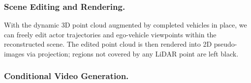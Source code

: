 \documentclass[runningheads]{llncs}
\begin{document}



\subsubsection{Scene Editing and Rendering.}
\label{sec:edit_render}
With the dynamic 3D point cloud augmented by completed vehicles in place, we can freely edit actor trajectories and ego-vehicle viewpoints within the reconstructed scene. The edited point cloud is then rendered into 2D pseudo-images via projection; regions not covered by any LiDAR point are left black.

\subsubsection{Conditional Video Generation.}
\label{sec:cond_gen}
\end{document}
